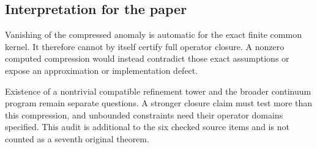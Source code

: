\subsection{Interpretation for the paper}
Vanishing of the compressed anomaly is automatic for the exact finite common kernel. It therefore cannot by itself certify full operator closure. A nonzero computed compression would instead contradict those exact assumptions or expose an approximation or implementation defect.

Existence of a nontrivial compatible refinement tower and the broader continuum program remain separate questions. A stronger closure claim must test more than this compression, and unbounded constraints need their operator domains specified. This audit is additional to the six checked source items and is not counted as a seventh original theorem.



